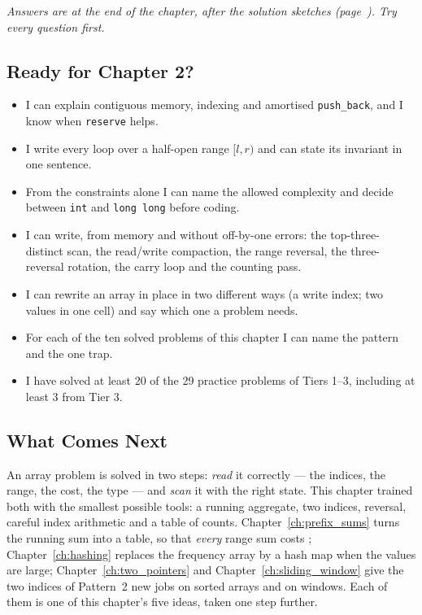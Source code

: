 \noindent\textit{Answers are at the end of the chapter, after the solution sketches (page~\pageref{ssec:ch1-quiz-answers}). Try every question first.}

\subsection{Ready for Chapter 2?}

\begin{checklistbox}
\begin{itemize}[leftmargin=*]
    \item[$\square$] I can explain contiguous memory,  indexing and amortised \texttt{push\_back}, and I know when \texttt{reserve} helps.
    \item[$\square$] I write every loop over a half-open range $[l, r)$ and can state its invariant in one sentence.
    \item[$\square$] From the constraints alone I can name the allowed complexity and decide between \texttt{int} and \texttt{long long} before coding.
    \item[$\square$] I can write, from memory and without off-by-one errors: the top-three-distinct scan, the read/write compaction, the range reversal, the three-reversal rotation, the carry loop and the counting pass.
    \item[$\square$] I can rewrite an array in place in two different ways (a write index; two values in one cell) and say which one a problem needs.
    \item[$\square$] For each of the ten solved problems of this chapter I can name the pattern and the one trap.
    \item[$\square$] I have solved at least 20 of the 29 practice problems of Tiers 1--3, including at least 3 from Tier 3.
\end{itemize}
\end{checklistbox}

\subsection{What Comes Next}

An array problem is solved in two steps: \emph{read} it correctly --- the indices, the range, the cost, the type --- and \emph{scan} it with the right state. This chapter trained both with the smallest possible tools: a running aggregate, two indices, reversal, careful index arithmetic and a table of counts. Chapter~\ref{ch:prefix_sums} turns the running sum into a table, so that \emph{every} range sum costs ; Chapter~\ref{ch:hashing} replaces the frequency array by a hash map when the values are large; Chapter~\ref{ch:two_pointers} and Chapter~\ref{ch:sliding_window} give the two indices of Pattern~2 new jobs on sorted arrays and on windows. Each of them is one of this chapter's five ideas, taken one step further.
